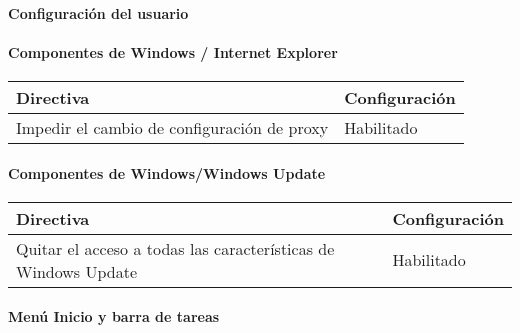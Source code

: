 \documentclass[
]{article}
\begin{document}
\hypertarget{section-6}{%
\paragraph{}\label{section-6}}

\hypertarget{section-7}{%
\paragraph{}\label{section-7}}

\textbf{Configuración del usuario}

\hypertarget{section-8}{%
\paragraph{}\label{section-8}}

\hypertarget{componentes-de-windows-internet-explorer}{%
\paragraph{Componentes de Windows / Internet
Explorer}\label{componentes-de-windows-internet-explorer}}

\begin{longtable}[]{@{}ll@{}}
\toprule
\textbf{Directiva} & \textbf{Configuración}\tabularnewline
\midrule
\endhead
Impedir el cambio de configuración de proxy & Habilitado\tabularnewline
\bottomrule
\end{longtable}

\hypertarget{section-9}{%
\paragraph{}\label{section-9}}

\hypertarget{componentes-de-windowswindows-update}{%
\paragraph{Componentes de Windows/Windows
Update}\label{componentes-de-windowswindows-update}}

\begin{longtable}[]{@{}ll@{}}
\toprule
\textbf{Directiva} & \textbf{Configuración}\tabularnewline
\midrule
\endhead
Quitar el acceso a todas las características de Windows Update &
Habilitado\tabularnewline
\bottomrule
\end{longtable}

\hypertarget{menuxfa-inicio-y-barra-de-tareas}{%
\paragraph{Menú Inicio y barra de
tareas}\label{menuxfa-inicio-y-barra-de-tareas}}
\end{document}
